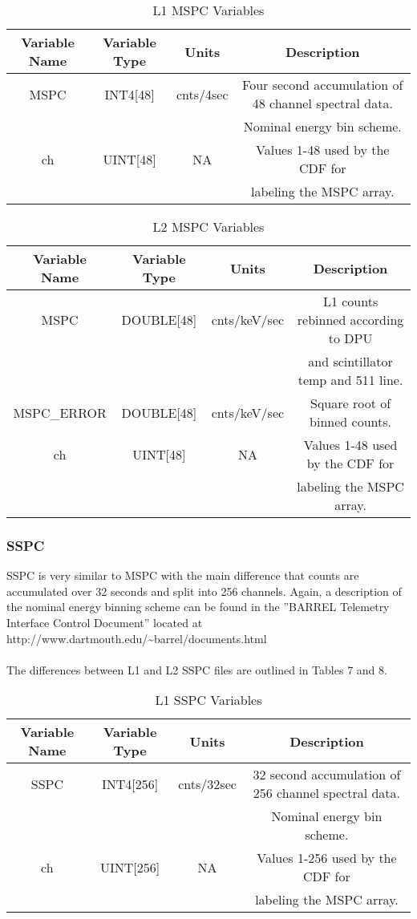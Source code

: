 \documentclass{article}
\begin{document}
\begin{table}[H]
\caption{L1 MSPC Variables}
\begin{tabular}{|c|c|c|c|}
\hline
Variable Name&Variable Type&Units&Description\\ \hline
MSPC&INT4[48]&cnts/4sec&Four second accumulation of 48 channel spectral data.\\
~&~&~&Nominal energy bin scheme.\\ 
ch&UINT[48]&NA&Values 1-48 used by the CDF for\\
~&~&~&labeling the MSPC array.\\
\hline
\end{tabular}
\end{table}

\begin{table}[H]
\caption{L2 MSPC Variables}
\begin{tabular}{|c|c|c|c|}
\hline
Variable Name&Variable Type&Units&Description\\ \hline
MSPC&DOUBLE[48]&cnts/keV/sec&L1 counts rebinned according to DPU\\
~&~&~&and scintillator temp and 511 line.\\ 
MSPC\_ERROR&DOUBLE[48]&cnts/keV/sec&Square root of binned counts.\\ 
ch&UINT[48]&NA&Values 1-48 used by the CDF for\\
~&~&~&labeling the MSPC array.\\
\hline
\end{tabular}
\end{table}

\subsubsection{SSPC}
SSPC is very similar to MSPC with the main difference that counts are accumulated over 32 seconds and split into 256 channels. Again, a description of the nominal energy binning scheme can be found  in the ''BARREL Telemetry Interface Control Document'' located at http://www.dartmouth.edu/\~{}barrel/documents.html\\\\
The differences between L1 and L2 SSPC files are outlined in Tables 7 and 8.

\begin{table}[H]
\caption{L1 SSPC Variables}
\begin{tabular}{|c|c|c|c|}
\hline
Variable Name&Variable Type&Units&Description\\ \hline
SSPC&INT4[256]&cnts/32sec&32 second accumulation of 256 channel spectral data.\\
~&~&~&Nominal energy bin scheme.\\ 
ch&UINT[256]&NA&Values 1-256 used by the CDF for\\
~&~&~&labeling the MSPC array.\\
\hline
\end{tabular}
\end{table}
\end{document}
